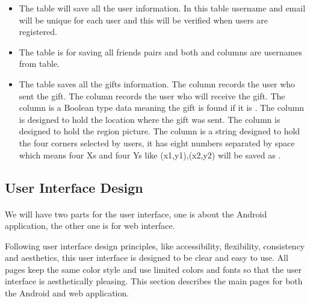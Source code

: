 \begin{itemize}
\item The  table will save all the user information. In this table username and email will be unique for each user and this will be verified when users are registered.
\item The  table is for saving all friends pairs and both  and  columns are usernames from  table.
\item The  table saves all the gifts information. The  column records the user who sent the gift. The  column records the user who will receive the gift. The  column is a Boolean type data meaning the gift is found if it is . The  column is designed to hold the location where the gift was sent. The  column is designed to hold the region picture. The  column is a string designed to hold the four corners selected by users, it has eight numbers separated by space which means four Xs and four Ys like (x1,y1),(x2,y2) will be saved as .
\end{itemize}

\subsection{User Interface Design}
\paragraph{} We will have two parts for the user interface, one is about the Android application, the other one is for web interface.
\par Following user interface design principles, like accessibility, flexibility, consistency and aesthetics, this user interface is designed to be clear and easy to use. All pages keep the same color style and use limited colors and fonts so that the user interface is aesthetically pleasing.\cite{galitz2007} This section describes the main pages for both the Android and web application.
